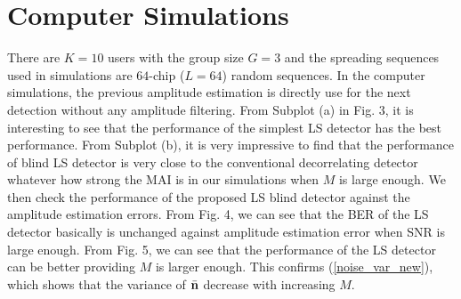 \documentclass[a4paper,10pt,fleqn, twocolumn]{IEEETran}
\newcommand{\bn}{{\bf n}}
\begin{document}
\section{Computer Simulations}
There are $K=10$ users with the group size $G=3$ and the spreading
sequences used in simulations are $64$-chip ($L=64$) random
sequences. In the computer simulations, the previous amplitude
estimation is directly use for the next detection without any
amplitude filtering. From Subplot (a) in Fig. 3, it is interesting
to see that the performance of the simplest LS detector has the
best performance. From Subplot (b), it is very impressive to find
that the performance of blind LS detector is very close to the
conventional decorrelating detector whatever how strong the MAI is
in our simulations when $M$ is large enough. We then check the
performance of the proposed LS blind detector against the
amplitude estimation errors. From Fig. 4, we can see that the BER
of the LS detector basically is unchanged against amplitude
estimation error when SNR is large enough. From Fig. 5, we can see
that the performance of the LS detector can be better providing
$M$ is larger enough. This confirms (\ref{noise_var_new}), which
shows that the variance of $\bar{\bn}$ decrease with increasing
$M$.
\begin{figure} \label{BER_SNR}
\end{figure}
\begin{figure} \label{BER_A_SNR}
\end{figure}
\end{document}
